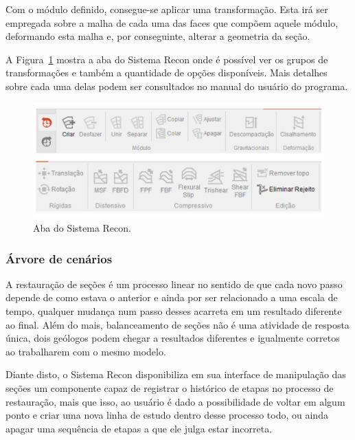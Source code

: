 Com o módulo definido, consegue-se aplicar uma transformação. Esta irá ser empregada sobre a malha de cada uma das faces que compõem aquele módulo, deformando esta malha e, por conseguinte, alterar a geometria da seção.

A Figura~\ref{fig-recon-5} mostra a aba  do Sistema Recon onde é possível ver os grupos de transformações e também a quantidade de opções disponíveis. Mais detalhes sobre cada uma delas podem ser consultados no manual do usuário do programa\cite{Recon}.

\begin{figure} [H]
  \begin{center}
    \includegraphics[width=\textwidth]{images/fig-recon-5}
    \caption{Aba  do Sistema Recon.}\label{fig-recon-5}
  \end{center}
\end{figure}

\subsubsection{Árvore de cenários}

A restauração de seções é um processo linear no sentido de que cada novo passo depende de como estava o anterior e ainda por ser relacionado a uma escala de tempo, qualquer mudança num passo desses acarreta em um resultado diferente ao final. Além do mais, balanceamento de seções não é uma atividade de resposta única, dois geólogos podem chegar a resultados diferentes e igualmente corretos ao trabalharem com o mesmo modelo. 

Diante disto, o Sistema Recon disponibiliza em sua interface de manipulação das seções um componente capaz de registrar o histórico de etapas no processo de restauração, mais que isso, ao usuário é dado a possibilidade de voltar em algum ponto e criar uma nova linha de estudo dentro desse processo todo, ou ainda apagar uma sequência de etapas a que ele julga estar incorreta.

